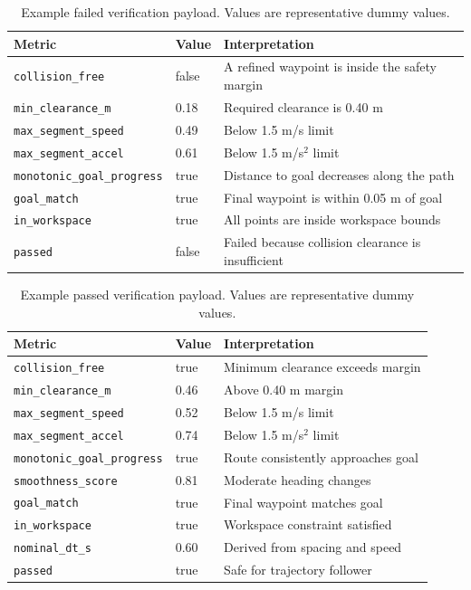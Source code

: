 \documentclass[11pt]{article}
\begin{document}
\begin{table}[H]
\centering
\caption{Example failed verification payload. Values are representative dummy values.}
\label{tab:failed-example}
\begin{tabular}{lll}
\toprule
Metric & Value & Interpretation \\
\midrule
\texttt{collision\_free} & false & A refined waypoint is inside the safety margin \\
\texttt{min\_clearance\_m} & 0.18 & Required clearance is 0.40 m \\
\texttt{max\_segment\_speed} & 0.49 & Below 1.5 m/s limit \\
\texttt{max\_segment\_accel} & 0.61 & Below 1.5 m/s\(^2\) limit \\
\texttt{monotonic\_goal\_progress} & true & Distance to goal decreases along the path \\
\texttt{goal\_match} & true & Final waypoint is within 0.05 m of goal \\
\texttt{in\_workspace} & true & All points are inside workspace bounds \\
\texttt{passed} & false & Failed because collision clearance is insufficient \\
\bottomrule
\end{tabular}
\end{table}

\begin{table}[H]
\centering
\caption{Example passed verification payload. Values are representative dummy values.}
\label{tab:passed-example}
\begin{tabular}{lll}
\toprule
Metric & Value & Interpretation \\
\midrule
\texttt{collision\_free} & true & Minimum clearance exceeds margin \\
\texttt{min\_clearance\_m} & 0.46 & Above 0.40 m margin \\
\texttt{max\_segment\_speed} & 0.52 & Below 1.5 m/s limit \\
\texttt{max\_segment\_accel} & 0.74 & Below 1.5 m/s\(^2\) limit \\
\texttt{monotonic\_goal\_progress} & true & Route consistently approaches goal \\
\texttt{smoothness\_score} & 0.81 & Moderate heading changes \\
\texttt{goal\_match} & true & Final waypoint matches goal \\
\texttt{in\_workspace} & true & Workspace constraint satisfied \\
\texttt{nominal\_dt\_s} & 0.60 & Derived from spacing and speed \\
\texttt{passed} & true & Safe for trajectory follower \\
\bottomrule
\end{tabular}
\end{table}
\end{document}
